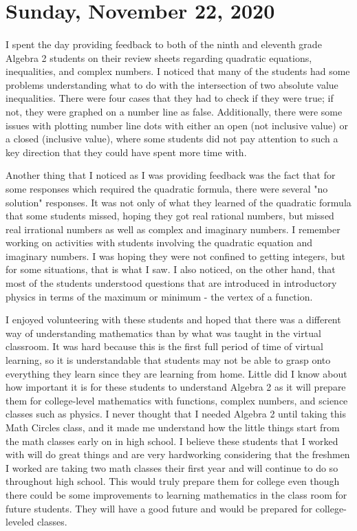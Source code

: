\documentclass{article}
\begin{document}
\section{Sunday, November 22, 2020}

\paragraph{}
I spent the day providing feedback to both of the ninth and eleventh grade Algebra 2 students on their review sheets regarding quadratic equations, inequalities, and complex numbers. I noticed that many of the students had some problems understanding what to do with the intersection of two absolute value inequalities. There were four cases that they had to check if they were true; if not, they were graphed on a number line as false. Additionally, there were some issues with plotting number line dots with either an open (not inclusive value) or a closed (inclusive value), where some students did not pay attention to such a key direction that they could have spent more time with. 

Another thing that I noticed as I was providing feedback was the fact that for some responses which required the quadratic formula, there were several "no solution" responses. It was not only of what they learned of the quadratic formula that some students missed, hoping they got real rational numbers, but missed real irrational numbers as well as complex and imaginary numbers. I remember working on activities with students involving the quadratic equation and imaginary numbers. I was hoping they were not confined to getting integers, but for some situations, that is what I saw. I also noticed, on the other hand, that most of the students understood questions that are introduced in introductory physics in terms of the maximum or minimum - the vertex of a function. 

I enjoyed volunteering with these students and hoped that there was a different way of understanding mathematics than by what was taught in the virtual classroom. It was hard because this is the first full period of time of virtual learning, so it is understandable that students may not be able to grasp onto everything they learn since they are learning from home. Little did I know about how important it is for these students to understand Algebra 2 as it will prepare them for college-level mathematics with functions, complex numbers, and science classes such as physics. I never thought that I needed Algebra 2 until taking this Math Circles class, and it made me understand how the little things start from the math classes early on in high school. I believe these students that I worked with will do great things and are very hardworking considering that the freshmen I worked are taking two math classes their first year and will continue to do so throughout high school. This would truly prepare them for college even though there could be some improvements to learning mathematics in the class room for future students. They will have a good future and would be prepared for college-leveled classes.  
\end{document}
